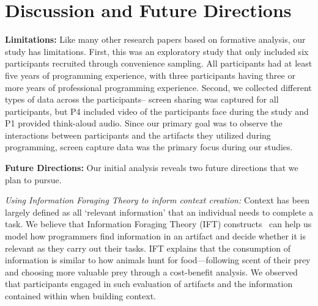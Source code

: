 
\section{Discussion and Future Directions}
\textbf{Limitations:} Like many other research papers based on formative analysis, our study has limitations. First, this was an exploratory study that only included six participants recruited through convenience sampling. All participants had at least five years of programming experience, with three participants having three or more years of professional programming experience. Second, we collected different types of data across the participants-- screen sharing was captured for all participants, but P4 included video of the participants face during the study and P1 provided think-aloud audio. Since our primary goal was to observe the interactions between participants and the artifacts they utilized during programming, screen capture data was the primary focus during our studies. 



\textbf{Future Directions:} Our initial analysis reveals two future directions that we plan to pursue. 


\textit{Using Information Foraging Theory to inform context creation:}
Context has been largely defined as all `relevant information' that an individual needs to complete a task. We believe that Information Foraging Theory (IFT) constructs~\cite{Pirolli:1995,Fleming:2013} can help us model how programmers find information in an artifact and decide whether it is relevant as they carry out their tasks. IFT explains that the consumption of information is similar to how animals hunt for food---following scent of their prey and choosing more valuable prey through a cost-benefit analysis. We observed that participants engaged in such evaluation of artifacts and the information contained within when building context. 

